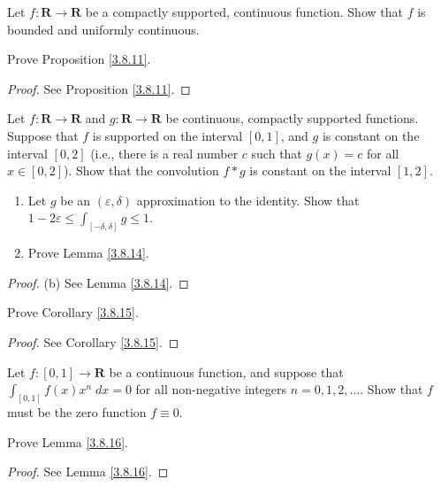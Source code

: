 \begin{exercise}\label{ex 3.8.3}
    Let \(f : \mathbf{R} \to \mathbf{R}\) be a compactly supported, continuous function.
    Show that \(f\) is bounded and uniformly continuous.
\end{exercise}

\begin{exercise}\label{ex 3.8.4}
    Prove Proposition \ref{3.8.11}.
\end{exercise}

\begin{proof}
    See Proposition \ref{3.8.11}.
\end{proof}

\begin{exercise}\label{ex 3.8.5}
    Let \(f : \mathbf{R} \to \mathbf{R}\) and \(g : \mathbf{R} \to \mathbf{R}\) be continuous, compactly supported functions.
    Suppose that \(f\) is supported on the interval \([0, 1]\), and \(g\) is constant on the interval \([0, 2]\)
    (i.e., there is a real number \(c\) such that \(g(x) = c\) for all \(x \in [0, 2]\)).
    Show that the convolution \(f * g\) is constant on the interval \([1, 2]\).
\end{exercise}

\begin{exercise}\label{ex 3.8.6}
    \quad
    \begin{enumerate}
        \item Let \(g\) be an \((\varepsilon, \delta)\) approximation to the identity.
              Show that \(1 - 2 \varepsilon \leq \int_{[-\delta, \delta]} g \leq 1\).
        \item Prove Lemma \ref{3.8.14}.
    \end{enumerate}
\end{exercise}

\begin{proof}{(b)}
    See Lemma \ref{3.8.14}.
\end{proof}

\begin{exercise}\label{ex 3.8.7}
    Prove Corollary \ref{3.8.15}.
\end{exercise}

\begin{proof}
    See Corollary \ref{3.8.15}.
\end{proof}

\begin{exercise}\label{ex 3.8.8}
    Let \(f : [0, 1] \to \mathbf{R}\) be a continuous function, and suppose that \(\int_{[0, 1]} f(x) x^n \; dx = 0\) for all non-negative integers \(n = 0, 1, 2, \dots\).
    Show that \(f\) must be the zero function \(f \equiv 0\).
\end{exercise}

\begin{exercise}\label{ex 3.8.9}
    Prove Lemma \ref{3.8.16}.
\end{exercise}

\begin{proof}
    See Lemma \ref{3.8.16}.
\end{proof}